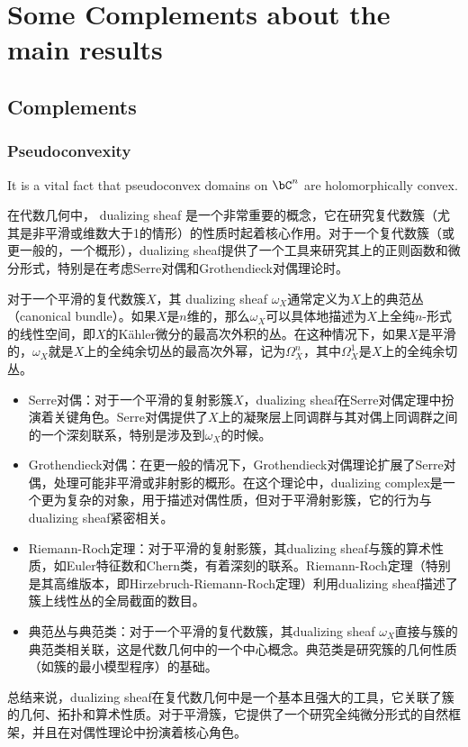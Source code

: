 \documentclass[lang=cn,zihao=-4,a4paper,fontset=none]{beautybook}
\begin{document}
\appendix
\part{Some Complements about the main results}

\chapter{Complements}
\section{Pseudoconvexity}

It is a vital fact that pseudoconvex domains on $\bC^n$ are holomorphically convex.

在代数几何中， dualizing sheaf 是一个非常重要的概念，它在研究复代数簇（尤其是非平滑或维数大于1的情形）的性质时起着核心作用。对于一个复代数簇（或更一般的，一个概形），dualizing sheaf提供了一个工具来研究其上的正则函数和微分形式，特别是在考虑Serre对偶和Grothendieck对偶理论时。

对于一个平滑的复代数簇$X$，其 dualizing sheaf  $\omega_X$通常定义为$X$上的典范丛（canonical bundle）。如果$X$是$n$维的，那么$\omega_X$可以具体地描述为$X$上全纯$n$-形式的线性空间，即$X$的Kähler微分的最高次外积的丛。在这种情况下，如果$X$是平滑的，$\omega_X$就是$X$上的全纯余切丛的最高次外幂，记为$\Omega_X^n$，其中$\Omega_X^1$是$X$上的全纯余切丛。
\begin{itemize}
    \item Serre对偶：对于一个平滑的复射影簇$X$，dualizing sheaf在Serre对偶定理中扮演着关键角色。Serre对偶提供了$X$上的凝聚层上同调群与其对偶上同调群之间的一个深刻联系，特别是涉及到$\omega_X$的时候。
    \item Grothendieck对偶：在更一般的情况下，Grothendieck对偶理论扩展了Serre对偶，处理可能非平滑或非射影的概形。在这个理论中，dualizing complex是一个更为复杂的对象，用于描述对偶性质，但对于平滑射影簇，它的行为与dualizing sheaf紧密相关。
    \item Riemann-Roch定理：对于平滑的复射影簇，其dualizing sheaf与簇的算术性质，如Euler特征数和Chern类，有着深刻的联系。Riemann-Roch定理（特别是其高维版本，即Hirzebruch-Riemann-Roch定理）利用dualizing sheaf描述了簇上线性丛的全局截面的数目。
    \item 典范丛与典范类：对于一个平滑的复代数簇，其dualizing sheaf $\omega_X$直接与簇的典范类相关联，这是代数几何中的一个中心概念。典范类是研究簇的几何性质（如簇的最小模型程序）的基础。
\end{itemize}
总结来说，dualizing sheaf在复代数几何中是一个基本且强大的工具，它关联了簇的几何、拓扑和算术性质。对于平滑簇，它提供了一个研究全纯微分形式的自然框架，并且在对偶性理论中扮演着核心角色。
\end{document}
